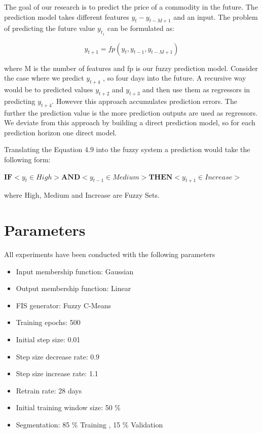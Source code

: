 The goal of our research is to predict the price of a commodity in the future. The prediction model takes different features $y_t - y_{t-M+1}$ and an input. The problem of predicting the future value $y_{t_1}$ can be formulated as: 


\begin{equation} \label{eq:solve}
y_{t + 1} = fp(y_{t}, y_{t-1}, y_{t-M+1})
 \end{equation}

where M is the number of features and fp is our fuzzy prediction model. Consider the case where we predict $y_{t +4}$ , so four days into the future. A recursive way would be to predicted values $y_{t+2}$ and $y_{t+3}$ and then use them as regressors in predicting $y_{t +4}$. However this approach accumulates prediction errors. The further the prediction value is the more prediction outputs are used as regressors. We deviate from this approach by building a direct prediction model, so for each prediction horizon one direct model. 

Translating the Equation 4.9 into the fuzzy system a prediction would take the following form: 

\centerline {$ \textbf{IF} <  y_t  \in High> \textbf{AND} < y_{t-1} \in Medium > \textbf{THEN} <  y_{t+1} \in Increase > $}

where High, Medium and Increase are Fuzzy Sets. 


\section{Parameters}

All experiments have been conducted with the following parameters



\begin{itemize}
  \item Input membership function: \indent Gaussian
  \item Output membership function: \indent Linear
  \item FIS generator: \indent Fuzzy C-Means 
  \item Training epochs: 500
  \item Initial step size: 0.01
  \item Step size decrease rate: 0.9
  \item Step size increase rate: 1.1
  \item Retrain rate: 28 days
  \item Initial training window size: 50 \%
  \item Segmentation: 85 \% Training , 15 \% Validation 
\end{itemize}



